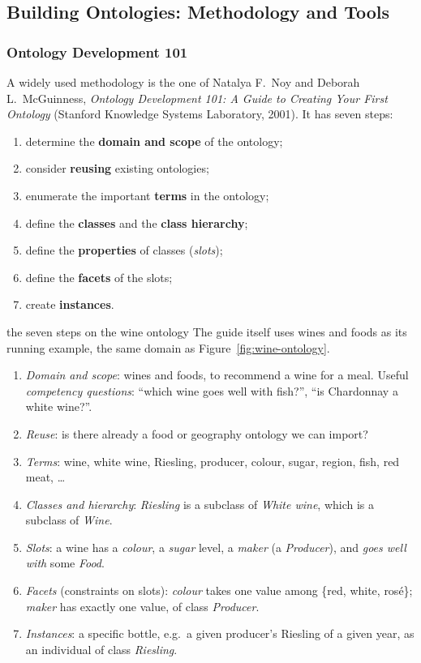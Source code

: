 \subsection{Building Ontologies: Methodology and Tools}
\label{sec:building-ontologies}

\subsubsection{Ontology Development 101}

A widely used methodology is the one of Natalya F.\ Noy and Deborah L.\ McGuinness,
\emph{Ontology Development 101: A Guide to Creating Your First Ontology} (Stanford
Knowledge Systems Laboratory, 2001). It has seven steps:
\begin{enumerate}[nosep]
  \item determine the \textbf{domain and scope} of the ontology;
  \item consider \textbf{reusing} existing ontologies;
  \item enumerate the important \textbf{terms} in the ontology;
  \item define the \textbf{classes} and the \textbf{class hierarchy};
  \item define the \textbf{properties} of classes (\emph{slots});
  \item define the \textbf{facets} of the slots;
  \item create \textbf{instances}.
\end{enumerate}

\begin{nbexample}{the seven steps on the wine ontology}
The guide itself uses wines and foods as its running example, the same domain as
Figure~\ref{fig:wine-ontology}.
\begin{enumerate}[nosep]
  \item \emph{Domain and scope}: wines and foods, to recommend a wine for a meal. Useful
        \emph{competency questions}: ``which wine goes well with fish?'', ``is
        Chardonnay a white wine?''.
  \item \emph{Reuse}: is there already a food or geography ontology we can import?
  \item \emph{Terms}: wine, white wine, Riesling, producer, colour, sugar, region,
        fish, red meat, \ldots
  \item \emph{Classes and hierarchy}: \emph{Riesling} is a subclass of \emph{White
        wine}, which is a subclass of \emph{Wine}.
  \item \emph{Slots}: a wine has a \emph{colour}, a \emph{sugar} level, a \emph{maker}
        (a \emph{Producer}), and \emph{goes well with} some \emph{Food}.
  \item \emph{Facets} (constraints on slots): \emph{colour} takes one value among
        \{red, white, rosé\}; \emph{maker} has exactly one value, of class
        \emph{Producer}.
  \item \emph{Instances}: a specific bottle, e.g.\ a given producer's Riesling of a
        given year, as an individual of class \emph{Riesling}.
\end{enumerate}
\end{nbexample}

